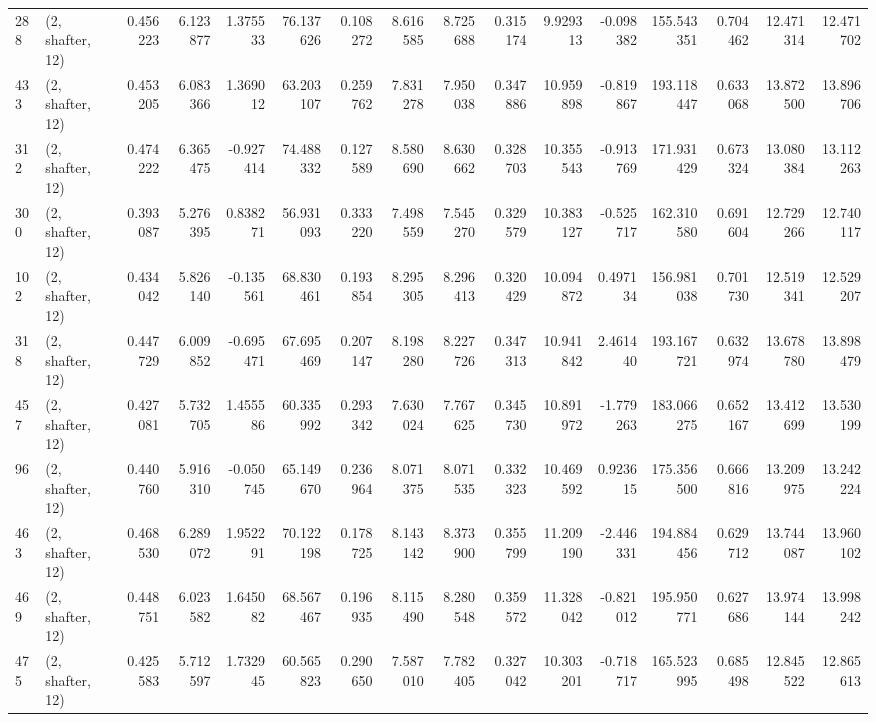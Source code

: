 \begin{tabular}{llrrrrrrrrrrrrrr}
288 &  (2, shafter, 12) &   0.456223 &   6.123877 &   1.375533 &    76.137626 &   0.108272 &   8.616585 &   8.725688 &  0.315174 &   9.929313 &  -0.098382 &   155.543351 &   0.704462 &  12.471314 &  12.471702 \\
433 &  (2, shafter, 12) &   0.453205 &   6.083366 &   1.369012 &    63.203107 &   0.259762 &   7.831278 &   7.950038 &  0.347886 &  10.959898 &  -0.819867 &   193.118447 &   0.633068 &  13.872500 &  13.896706 \\
312 &  (2, shafter, 12) &   0.474222 &   6.365475 &  -0.927414 &    74.488332 &   0.127589 &   8.580690 &   8.630662 &  0.328703 &  10.355543 &  -0.913769 &   171.931429 &   0.673324 &  13.080384 &  13.112263 \\
300 &  (2, shafter, 12) &   0.393087 &   5.276395 &   0.838271 &    56.931093 &   0.333220 &   7.498559 &   7.545270 &  0.329579 &  10.383127 &  -0.525717 &   162.310580 &   0.691604 &  12.729266 &  12.740117 \\
102 &  (2, shafter, 12) &   0.434042 &   5.826140 &  -0.135561 &    68.830461 &   0.193854 &   8.295305 &   8.296413 &  0.320429 &  10.094872 &   0.497134 &   156.981038 &   0.701730 &  12.519341 &  12.529207 \\
318 &  (2, shafter, 12) &   0.447729 &   6.009852 &  -0.695471 &    67.695469 &   0.207147 &   8.198280 &   8.227726 &  0.347313 &  10.941842 &   2.461440 &   193.167721 &   0.632974 &  13.678780 &  13.898479 \\
457 &  (2, shafter, 12) &   0.427081 &   5.732705 &   1.455586 &    60.335992 &   0.293342 &   7.630024 &   7.767625 &  0.345730 &  10.891972 &  -1.779263 &   183.066275 &   0.652167 &  13.412699 &  13.530199 \\
96  &  (2, shafter, 12) &   0.440760 &   5.916310 &  -0.050745 &    65.149670 &   0.236964 &   8.071375 &   8.071535 &  0.332323 &  10.469592 &   0.923615 &   175.356500 &   0.666816 &  13.209975 &  13.242224 \\
463 &  (2, shafter, 12) &   0.468530 &   6.289072 &   1.952291 &    70.122198 &   0.178725 &   8.143142 &   8.373900 &  0.355799 &  11.209190 &  -2.446331 &   194.884456 &   0.629712 &  13.744087 &  13.960102 \\
469 &  (2, shafter, 12) &   0.448751 &   6.023582 &   1.645082 &    68.567467 &   0.196935 &   8.115490 &   8.280548 &  0.359572 &  11.328042 &  -0.821012 &   195.950771 &   0.627686 &  13.974144 &  13.998242 \\
475 &  (2, shafter, 12) &   0.425583 &   5.712597 &   1.732945 &    60.565823 &   0.290650 &   7.587010 &   7.782405 &  0.327042 &  10.303201 &  -0.718717 &   165.523995 &   0.685498 &  12.845522 &  12.865613 \\

\end{tabular}

